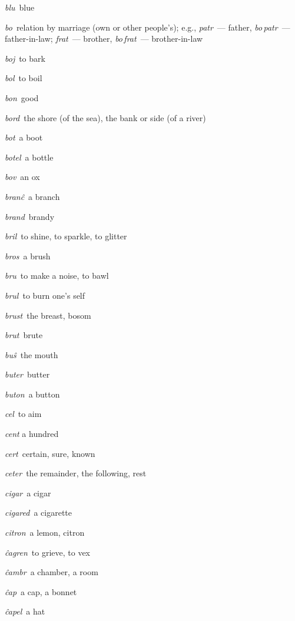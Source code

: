\begin{landscape}
\begin{multicols}{5}
\begin{outdent}{1em}
\emph{blu\,} blue

\emph{bo\,} relation by marriage (own or other people’s); e.g., \emph{patr\,} — father, \emph{bo\,patr\,} — father-in-law; \emph{frat\,} — brother, \emph{bo\,frat\,} — brother-in-law

\emph{boj\,} to bark

\emph{bol\,} to boil

\emph{bon\,} good

\emph{bord\,} the shore (of the sea), the bank or side (of a river)

\emph{bot\,} a boot

\emph{botel\,} a bottle

\emph{bov\,} an ox

\emph{branĉ\,} a branch

\emph{brand\,} brandy

\emph{bril\,} to shine, to sparkle, to glitter

\emph{bros\,} a brush

\emph{bru\,} to make a noise, to bawl

\emph{brul\,} to burn one’s self

\emph{brust\,} the breast, bosom

\emph{brut\,} brute

\emph{buŝ\,} the mouth

\emph{buter\,} butter

\emph{buton\,} a button
\end{outdent}


\begin{outdent}{1em}
\emph{cel\,} to aim

\emph{cent} a hundred

\emph{cert\,} certain, sure, known

\emph{ceter\,} the remainder, the following, rest

\emph{cigar\,} a cigar

\emph{cigared\,} a cigarette

\emph{citron\,} a lemon, citron
\end{outdent}


\begin{outdent}{1em}
\emph{ĉagren\,} to grieve, to vex

\emph{ĉambr\,} a chamber, a room

\emph{ĉap\,} a cap, a bonnet

\emph{ĉapel\,} a hat


\end{outdent}
\end{multicols}
\end{landscape}
